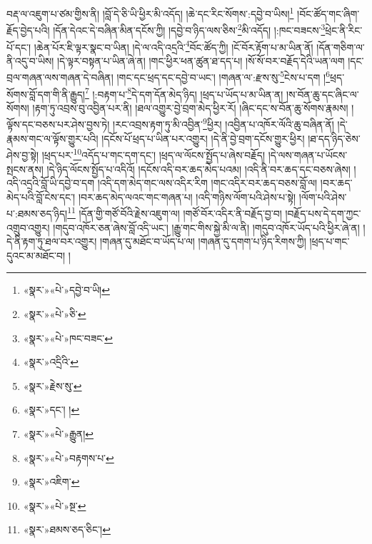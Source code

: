 བརྡ་ལ་འཇུག་པ་ཙམ་གྱིས་ནི། །བློ་དེ་ཅི་ཡི་ཕྱིར་མི་འདོད། །ཆེ་དང་རིང་སོགས་:དབྱེ་བ་ཡིས།\footnote{«སྣར་»«པེ་»དབྱེ་བ་ཡི།} །བོང་ཚོད་གང་ཞིག་རྗོད་བྱེད་པའི། །དོན་དེའང་དེ་བཞིན་མིན་དངོས་ཀྱི། །དབྱེ་བ་ཉིད་ལས་ཅིས་\footnote{«སྣར་»«པེ་»ཅི་}མི་འདོད། །:ཁང་བཟངས་\footnote{«སྣར་»«པེ་»ཁང་བཟང་}ཕྲེང་ནི་རིང་པོ་དང་། །ཆེན་པོར་ཇི་ལྟར་སྣང་བ་ཡིན། །དེ་ལ་འདི་འདྲའི་\footnote{«སྣར་»འདྲིའི་}བོང་ཚོད་ཀྱི། །ངོ་བོར་རྟོག་པ་མ་ཡིན་ནོ། །དོན་གཅིག་ལ་ནི་འདུ་བ་ཡིས། །དེ་ལྟར་བསྟན་པ་ཡིན་ཞེ་ན། །གང་ཕྱིར་ཕན་ཚུན་ཐ་དད་པ། །སོ་སོ་བར་བརྗོད་དེའི་ཡན་ལག །དང་བྲལ་གཞན་ལས་གཞན་དེ་བཞིན། །གང་དང་ཕྲད་དང་དབྱེ་བ་ཡང་། །གཞན་ལ་:རྫས་སུ་\footnote{«སྣར་»རྗེས་སུ་}ངེས་པ་དག །\footnote{«སྣར་»དང་། །}ཕྲད་སོགས་བློ་དག་གི་ནི་རྒྱུད།\footnote{«སྣར་»«པེ་»རྒྱུན།} །:བརྟག་པ་\footnote{«སྣར་»«པེ་»བརྟགས་པ་}དེ་དག་དོན་མེད་ཉིད། །ཕྲད་པ་ཡོད་པ་མ་ཡིན་ན། །ས་བོན་ཆུ་དང་ཞིང་ལ་སོགས། །རྟག་ཏུ་འབྲས་བུ་འབྱིན་པར་ནི། །ཐལ་འགྱུར་བྱེ་བྲག་མེད་ཕྱིར་རོ། །ཞིང་དང་ས་བོན་ཆུ་སོགས་རྣམས། །ལྟོས་དང་བཅས་པར་ཤེས་བྱས་ཏེ། །རང་འབྲས་རྟག་ཏུ་མི་འབྱིན་\footnote{«སྣར་»འཇིག་}ཕྱིར། །འབྱིན་པ་འཁོར་ལོའི་ཆུ་བཞིན་ནོ། །དེ་རྣམས་གང་ལ་ལྟོས་གྱུར་པའི། །དངོས་པོ་ཕྲད་པ་ཡིན་པར་འགྱུར། །དེ་ནི་བྱེ་བྲག་དངོས་གྱུར་ཕྱིར། །ཐ་དད་ཉིད་ཅེས་ཤེས་བྱ་སྟེ། །ཕྲད་པར་\footnote{«སྣར་»«པེ་»སྔ་}འདོད་པ་གང་དག་དང་། །ཕྲད་ལ་ལོངས་སྤྱོད་པ་ཞེས་བརྗོད། །དེ་ལས་གཞན་པ་ཡོངས་སྤངས་ནས། །དེ་ཉིད་ལོངས་སྤྱོད་པ་འདིའོ། །དངོས་འདི་བར་ཆད་མེད་པའམ། །འདི་ནི་བར་ཆད་དང་བཅས་ཞེས། །འདི་འདྲའི་བློ་ཡི་དབྱེ་བ་དག །འདི་དག་མེད་གང་ལས་འདིར་རིག །གང་འདིར་བར་ཆད་བཅས་བློ་ལ། །བར་ཆད་མེད་པའི་བློ་ངེས་དང་། །བར་ཆད་མེད་ལའང་གང་གཞན་པ། །འདི་གཉིས་ལོག་པའི་ཤེས་པ་སྟེ། །ལོག་པའི་ཤེས་པ་:ཐམས་ཅད་ཉིད།\footnote{«སྣར་»ཐམས་ཅད་ཅིང་།} །དོན་གྱི་གཙོ་བོའི་རྗེས་འཇུག་ལ། །གཙོ་བོར་འདིར་ནི་བརྗོད་བྱ་བ། །བརྗོད་པས་དེ་དག་ཀྱང་འགྲུབ་འགྱུར། །གདུབ་འཁོར་ཅན་ཞེས་བློ་འདི་ཡང་། །རྒྱུ་གང་གིས་སྐྱེ་མི་ལ་ནི། །གདུབ་འཁོར་ཡོད་པའི་ཕྱིར་ཞེ་ན། །དེ་ནི་རྟག་ཏུ་ཐལ་བར་འགྱུར། །གཞན་དུ་མཐོང་བ་ཡོད་པ་ལ། །གཞན་དུ་དགག་པ་ཉིད་རིགས་ཀྱི། །ཕྲད་པ་གང་དུའང་མ་མཐོང་བ། །
